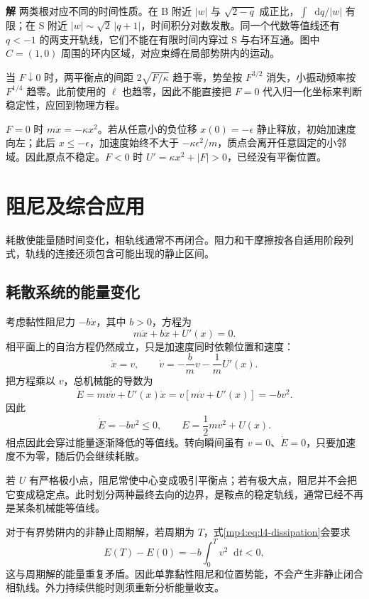\documentclass[11pt,openany,fontset=fandol]{ctexbook}
\theoremstyle{definition}\newtheorem{example}{例}[chapter]\newtheorem{exercise}{习题}[chapter]
\newcommand{\SolutionStart}{\par\medskip\ifdim\pagetotal>0pt\ifdim\dimexpr\pagegoal-\pagetotal\relax<3\baselineskip\newpage\fi\fi\noindent\textbf{解}\quad\ignorespaces}
\newenvironment{solution}{\SolutionStart}{\par\medskip}
\newcommand{\dd}{\mathop{}\!\mathrm d}\newcommand{\ee}{\mathrm e}\newcommand{\vct}[1]{\bm{#1}}
\begin{document}
\begin{solution}
两类根对应不同的时间性质。在 B 附近 $|w|$ 与 $\sqrt{2-q}$ 成正比，$\int\dd q/|w|$ 有限；在 S 附近 $|w|\sim\sqrt2\,|q+1|$，时间积分对数发散。同一个代数等值线还有 $q<-1$ 的两支开轨线，它们不能在有限时间内穿过 S 与右环互通。图中 $C=(1,0)$ 周围的环内区域，对应束缚在局部势阱内的运动。

当 $F\downarrow0$ 时，两平衡点的间距 $2\sqrt{F/\kappa}$ 趋于零，势垒按 $F^{3/2}$ 消失，小振动频率按 $F^{1/4}$ 趋零。此前使用的 $\ell$ 也趋零，因此不能直接把 $F=0$ 代入归一化坐标来判断稳定性，应回到物理方程。

$F=0$ 时 $m\ddot x=-\kappa x^2$。若从任意小的负位移 $x(0)=-\epsilon$ 静止释放，初始加速度向左；此后 $x\le-\epsilon$，加速度始终不大于 $-\kappa\epsilon^2/m$，质点会离开任意固定的小邻域。因此原点不稳定。$F<0$ 时 $U'=\kappa x^2+|F|>0$，已经没有平衡位置。
\end{solution}

\section{阻尼及综合应用}
耗散使能量随时间变化，相轨线通常不再闭合。阻力和干摩擦按各自适用阶段列式，轨线的连接还须包含可能出现的静止区间。

\subsection{耗散系统的能量变化}
考虑黏性阻尼力 $-b\dot x$，其中 $b>0$，方程为
\[
m\ddot x+b\dot x+U'(x)=0.
\]
相平面上的自治方程仍然成立，只是加速度同时依赖位置和速度：
\[
\dot x=v,\qquad \dot v=-\frac bm v-\frac1mU'(x).
\]
把方程乘以 $v$，总机械能的导数为
\[
\dot E=mv\dot v+U'(x)\dot x
=v[m\dot v+U'(x)]=-bv^2.
\]
因此
\begin{equation}\label{mp4:eq:l4-dissipation}
\dot E=-bv^2\le0,\qquad E=\frac12mv^2+U(x).
\end{equation}
相点因此会穿过能量逐渐降低的等值线。转向瞬间虽有 $v=0$、$\dot E=0$，只要加速度不为零，随后仍会继续耗散。

若 $U$ 有严格极小点，阻尼常使中心变成吸引平衡点；若有极大点，阻尼并不会把它变成稳定点。此时划分两种最终去向的边界，是鞍点的稳定轨线，通常已经不再是某条机械能等值线。

对于有界势阱内的非静止周期解，若周期为 $T$，式\eqref{mp4:eq:l4-dissipation}会要求
\[
E(T)-E(0)=-b\int_0^T v^2\dd t<0,
\]
这与周期解的能量重复矛盾。因此单靠黏性阻尼和位置势能，不会产生非静止闭合相轨线。外力持续供能时则须重新分析能量收支。
\end{document}
